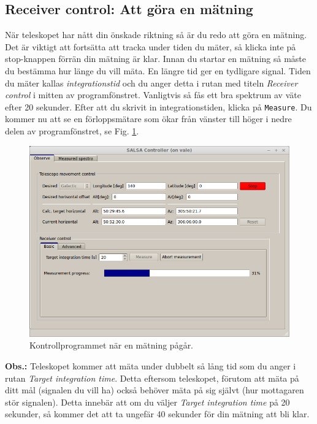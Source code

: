 \subsection{Receiver control: Att göra en mätning}
När teleskopet har nått din önskade riktning så är du redo att göra en mätning. 
Det är viktigt att fortsätta att tracka under tiden du mäter, så klicka inte på 
stop-knappen förrän din mätning är klar. Innan du startar en mätning så
måste du bestämma hur länge du vill mäta. En längre tid ger en tydligare signal. 
Tiden du mäter kallas \emph{integrationstid} och du anger detta i rutan med titeln
\emph{Receiver control} i mitten av programfönstret. Vanligtvis så fås ett bra spektrum
av väte efter 20 sekunder. Efter att du skrivit in integrationstiden, klicka på 
{\tt Measure}. Du kommer nu att se en förloppsmätare som ökar från vänster
till höger i nedre delen av programfönstret, se Fig. \ref{fig:controlmeasure}.
\begin{figure}[ht]
\begin{center}
\includegraphics[width=\textwidth]{../figures/Controller_measure.png}
\end{center}
\caption{Kontrollprogrammet när en mätning pågår.}
\label{fig:controlmeasure}
\end{figure}

{\bf Obs.:} Teleskopet kommer att mäta under dubbelt så lång tid som du 
anger i rutan \emph{Target integration time}. Detta eftersom teleskopet, förutom att
mäta på ditt mål (signalen du vill ha) också behöver mäta på sig självt (hur
mottagaren stör signalen). Detta innebär att om du väljer \emph{Target
integration time} på 20 sekunder, så kommer det att ta ungefär 40 sekunder för
din mätning att bli klar. 

